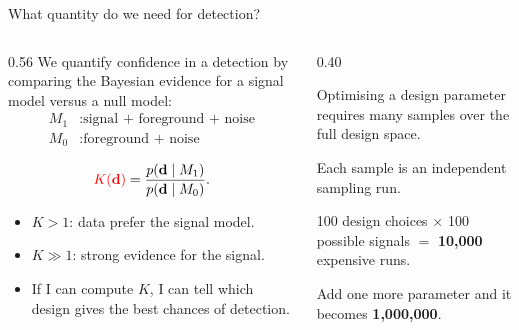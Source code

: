 \documentclass[aspectratio=169]{beamer}
\newcommand{\red}[1]{\textcolor{red}{#1}}
\begin{document}
\begin{frame}{\small{What quantity do we need for detection?}}
\begin{columns}[T,onlytextwidth]
\begin{column}{0.56\textwidth}
\small
We quantify confidence in a detection by comparing the Bayesian evidence for a signal model versus a null model:
\begin{align*}
M_1 &: \text{signal + foreground + noise} \\
M_0 &: \text{foreground + noise}
\end{align*}

\vspace{-0.16cm}
\[
\red{K(\mathbf d)}
=
\frac{p(\mathbf d \mid M_1)}{p(\mathbf d \mid M_0)}.
\]

\vspace{-0.12cm}
\begin{itemize}
\item $K > 1$: data prefer the signal model.
\item $K \gg 1$: strong evidence for the signal.
\item If I can compute $K$, I can tell which design gives the best chances of detection.
\end{itemize}
\end{column}
\begin{column}{0.40\textwidth}
\begin{tcolorbox}[keybox,title=The bottleneck]
\footnotesize
Optimising a design parameter requires many samples over the full design space.

\vspace{0.08cm}
Each sample is an independent sampling run.

\vspace{0.08cm}
100 design choices $\times$ 100 possible signals $=$ \textbf{10,000} expensive runs.

\vspace{0.08cm}
Add one more parameter and it becomes \textbf{1,000,000}.
\end{tcolorbox}
\end{column}
\end{columns}
\end{frame}
\end{document}
